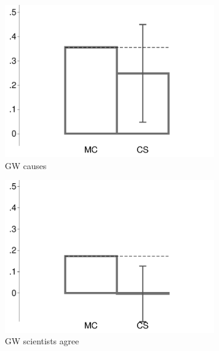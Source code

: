 \begin{figure}[t]
\begin{subfigure}{.325\textwidth}
		\includegraphics[width=\textwidth]{../figs/confidence_score_ccd_fsr_fsr_increase_study1.pdf}
		\caption{GW causes}
	\end{subfigure}	
	\hfill
	\begin{subfigure}{.325\textwidth}\centering
		\includegraphics[width=\textwidth]{../figs/confidence_score_ccd_fsr_fsr_science_study1.pdf}
		\caption{GW scientists agree}
	\end{subfigure}	
	\begin{subfigure}{.325\textwidth}\centering

\end{subfigure}
\end{figure}
